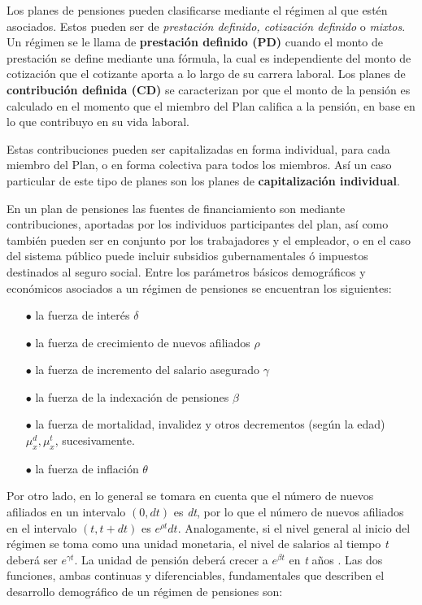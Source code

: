 \documentclass[12pt,letterpaper,titlepage]{article}
\begin{document}
Los planes de pensiones pueden clasificarse mediante el régimen al que estén asociados. Estos pueden ser de \textit{prestación definido,  cotización definido} o \textit{mixtos}. Un régimen se le llama de \textbf{prestación definido (PD)} cuando el monto de prestación se define mediante una fórmula, la cual es independiente del monto de cotización que el cotizante aporta a lo largo de su carrera laboral. Los planes de \textbf{contribución definida (CD)} se caracterizan por que el monto de la pensión es calculado en el momento que el miembro del Plan califica a la pensión, en base en lo que contribuyo en su vida laboral. 

Estas contribuciones pueden ser capitalizadas en forma individual, para  cada miembro del Plan, o en forma colectiva para todos los miembros. Así un caso particular de este tipo de planes son los planes de \textbf{capitalización individual}.

En un plan de pensiones las fuentes de financiamiento son mediante contribuciones, aportadas por los individuos participantes del plan, así como también pueden ser en conjunto por los trabajadores y el empleador, o en el caso del sistema público puede incluir subsidios gubernamentales ó impuestos destinados al seguro social. Entre los parámetros básicos demográficos y económicos asociados a un régimen de pensiones se encuentran los siguientes:
 
\begin{itemize}
	\item [$\bullet$] la fuerza de interés $\delta$
 	\item [$\bullet$] la fuerza de crecimiento de nuevos afiliados $\rho$
 	\item [$\bullet$] la fuerza de incremento del salario asegurado $\gamma$
 	\item [$\bullet$] la fuerza de la indexación de pensiones $\beta$
 	\item [$\bullet$] la fuerza de mortalidad, invalidez y otros decrementos (según la edad) $\mu_{x}^{d}, \mu_{x}^{t}$, sucesivamente.
 	\item [$\bullet$] la fuerza de inflación $\theta$
 \end{itemize}
 
  
 Por otro lado, en lo general se tomara en cuenta que el número de nuevos afiliados en un intervalo $(0, dt)$ es \textit{dt}, por lo que el número de nuevos afiliados en el intervalo $(t, t+dt)$ es $e^{\rho t}dt$. Analogamente, si el nivel general al inicio del régimen se toma como una unidad monetaria, el nivel de salarios al tiempo \textit{t} deberá ser $e^{\gamma t}$. La unidad de pensión deberá crecer a $e^{\beta t}$ en \textit{t} años \cite{778}. Las dos funciones, ambas continuas y diferenciables, fundamentales que describen el desarrollo demográfico de un régimen de pensiones son:
\end{document}
